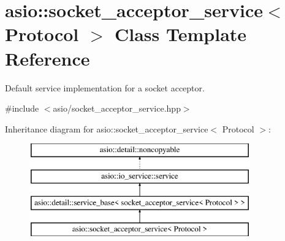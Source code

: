\hypertarget{classasio_1_1socket__acceptor__service}{}\section{asio\+:\+:socket\+\_\+acceptor\+\_\+service$<$ Protocol $>$ Class Template Reference}
\label{classasio_1_1socket__acceptor__service}


Default service implementation for a socket acceptor.  




{\ttfamily \#include $<$asio/socket\+\_\+acceptor\+\_\+service.\+hpp$>$}

Inheritance diagram for asio\+:\+:socket\+\_\+acceptor\+\_\+service$<$ Protocol $>$\+:\begin{figure}[H]
\begin{center}
\leavevmode
\includegraphics[height=4.000000cm]{classasio_1_1socket__acceptor__service}
\end{center}
\end{figure}
